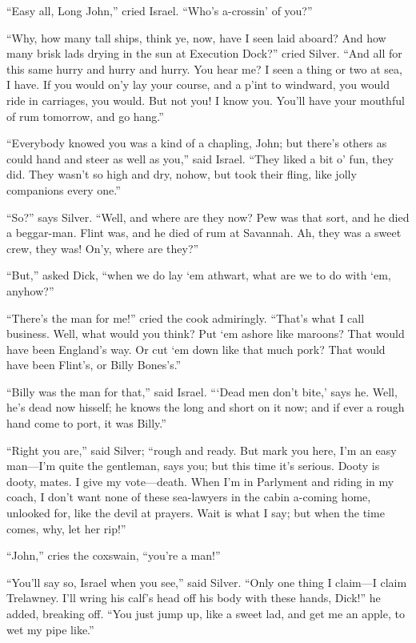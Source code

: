 \enquote{Easy all, Long John,} cried Israel. \enquote{Who’s a-crossin’ of you?}

\enquote{Why, how many tall ships, think ye, now, have I seen laid aboard? And how many brisk lads drying in the sun at Execution Dock?} cried Silver. \enquote{And all for this same hurry and hurry and hurry. You hear me? I seen a thing or two at sea, I have. If you would on’y lay your course, and a p’int to windward, you would ride in carriages, you would. But not you! I know you. You’ll have your mouthful of rum tomorrow, and go hang.}

\enquote{Everybody knowed you was a kind of a chapling, John; but there’s others as could hand and steer as well as you,} said Israel. \enquote{They liked a bit o’ fun, they did. They wasn’t so high and dry, nohow, but took their fling, like jolly companions every one.}

\enquote{So?} says Silver. \enquote{Well, and where are they now? Pew was that sort, and he died a beggar-man. Flint was, and he died of rum at Savannah. Ah, they was a sweet crew, they was! On’y, where are they?}

\enquote{But,} asked Dick, \enquote{when we do lay `em athwart, what are we to do with `em, anyhow?}

\enquote{There’s the man for me!} cried the cook admiringly. \enquote{That’s what I call business. Well, what would you think? Put `em ashore like maroons? That would have been England’s way. Or cut `em down like that much pork? That would have been Flint’s, or Billy Bones’s.}

\enquote{Billy was the man for that,} said Israel. \enquote{‘Dead men don’t bite,’ says he. Well, he’s dead now hisself; he knows the long and short on it now; and if ever a rough hand come to port, it was Billy.}

\enquote{Right you are,} said Silver; \enquote{rough and ready. But mark you here, I’m an easy man---I’m quite the gentleman, says you; but this time it’s serious. Dooty is dooty, mates. I give my vote---death. When I’m in Parlyment and riding in my coach, I don’t want none of these sea-lawyers in the cabin a-coming home, unlooked for, like the devil at prayers. Wait is what I say; but when the time comes, why, let her rip!}

\enquote{John,} cries the coxswain, \enquote{you’re a man!}

\enquote{You’ll say so, Israel when you see,} said Silver. \enquote{Only one thing I claim---I claim Trelawney. I’ll wring his calf’s head off his body with these hands, Dick!} he added, breaking off. \enquote{You just jump up, like a sweet lad, and get me an apple, to wet my pipe like.}

